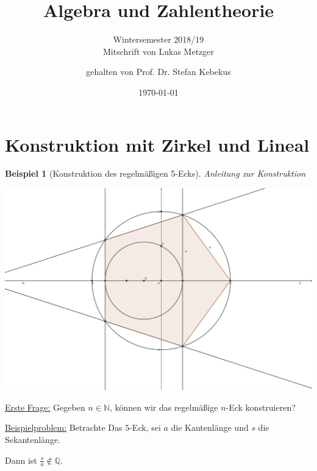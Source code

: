 \documentclass[a4paper,12pt,numbers=noenddot,parskip=full]{scrartcl}
\title{Algebra und Zahlentheorie}
\subtitle{Wintersemester 2018/19 \\ Mitschrift von Lukas Metzger}
\author{gehalten von Prof. Dr. Stefan Kebekus}
\date{\today}
\newcommand{\setN}{\mathbb{N}}
\newcommand{\setQ}{\mathbb{Q}}
\newcommand{\heading}{\underline}
\theoremstyle{dotless}
\newtheorem{example}[theorem]{Beispiel}
\theoremstyle{remark}
\begin{document}
	\pagestyle{headings}
\begin{titlepage}
	\maketitle	
	\thispagestyle{empty}
\end{titlepage}
\newpage 
\thispagestyle{empty}
\quad 
\newpage
\tableofcontents 
\thispagestyle{empty}

\newpage
\setcounter{page}{1}
	
	\setcounter{section}{-1}
	\section{Konstruktion mit Zirkel und Lineal}
	
	\begin{example}[Konstruktion des regelmäßigen 5-Ecks]
		Anleitung zur Konstruktion
		\begin{center}
			\includegraphics[width=0.8\linewidth]{bilder/bild1.png}
		\end{center}
	\end{example}

	\heading{Erste Frage:} Gegeben $n \in \setN$, können wir das regelmäßige $n$-Eck konstruieren?
	
	\heading{Beispielproblem:} Betrachte Das $5$-Eck, sei $a$ die Kantenlänge und $s$ die Sekantenlänge.
	
	Dann ist $\frac{s}{a} \notin \setQ$.
	
\end{document}
